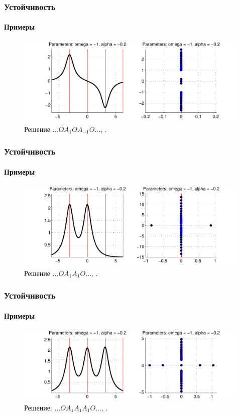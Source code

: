 \documentclass{beamer}
\begin{document}
\begin{frame}
	\frametitle{Устойчивость}
	\framesubtitle{Примеры}
	
	\begin{figure}
		\includegraphics[width=1\textwidth]{pic/example_4.pdf}
		\caption{Решение $\dots O A_1 O A_{-1} O \dots$, {\it \color{forestgreen}{линейно устойчиво}}.}
		\label{pic:example_4}
	\end{figure}
\end{frame}

\begin{frame}
	\frametitle{Устойчивость}
	\framesubtitle{Примеры}
	
	\begin{figure}
		\includegraphics[width=1\textwidth]{pic/example_5.pdf}
		\caption{Решение $\dots O A_1 A_1 O \dots$, {\it \color{fireenginered}{экспоненциально неустойчиво}}.}
		\label{pic:example_5}
	\end{figure}
\end{frame}

\begin{frame}
	\frametitle{Устойчивость}
	\framesubtitle{Примеры}
	
	\begin{figure}
		\includegraphics[width=1\textwidth]{pic/example_6.pdf}
		\caption{Решение: $\dots O A_1 A_1 A_1 O \dots$, {\it \color{fireenginered}{экспоненциально неустойчиво}}.}
		\label{pic:example_6}
	\end{figure}
\end{frame}
\end{document}
